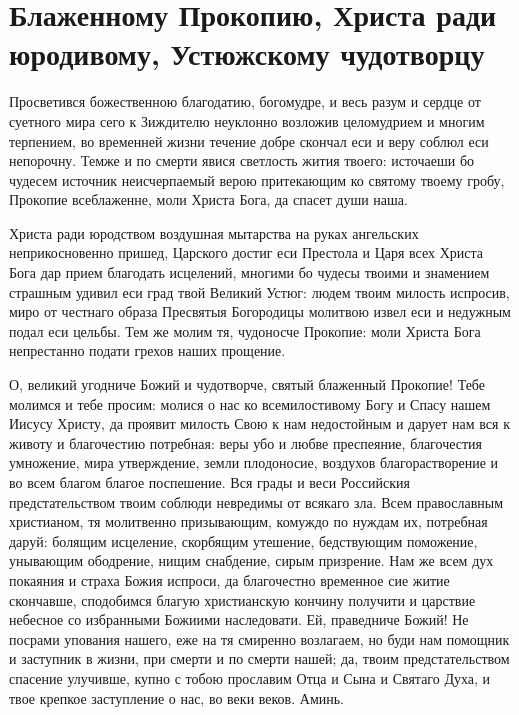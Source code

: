 \section{Блаженному Прокопию, Христа ради юродивому, Устюжскому  чудотворцу}\begin{mymulticols}
 


Просветився божественною благодатию, богомудре, и весь разум и сердце от суетного мира сего к Зиждителю неуклонно возложив целомудрием и многим терпением, во временней жизни течение добре скончал еси и веру соблюл еси непорочну. Темже и по смерти явися светлость жития твоего: источаеши бо чудесем источник неисчерпаемый верою притекающим ко святому твоему гробу, Прокопие всеблаженне, моли Христа Бога, да спасет души наша.


Христа ради юродством воздушная мытарства на руках ангельских неприкосновенно пришед, Царского достиг еси Престола и Царя всех Христа Бога дар прием благодать исцелений, многими бо чудесы твоими и знамением страшным удивил еси град твой Великий Устюг: людем твоим милость испросив, миро от честнаго образа Пресвятыя Богородицы молитвою извел еси и недужным подал еси цельбы. Тем же молим тя, чудоносче Прокопие: моли Христа Бога непрестанно подати грехов наших прощение.


О, великий угодниче Божий и чудотворче, святый блаженный Прокопие! Тебе молимся и тебе просим: молися о нас ко всемилостивому Богу и Спасу нашем Иисусу Христу, да проявит милость Свою к нам недостойным и дарует нам вся к животу и благочестию потребная: веры убо и любве преспеяние, благочестия умножение, мира утверждение, земли плодоносие, воздухов благорастворение и во всем благом благое поспешение. Вся грады и веси Российския предстательством твоим соблюди невредимы от всякаго зла. Всем православным христианом, тя молитвенно призывающим, комуждо по нуждам их, потребная даруй: болящим исцеление, скорбящим утешение, бедствующим поможение, унывающим ободрение, нищим снабдение, сирым призрение.  Нам же всем дух покаяния и страха Божия испроси, да благочестно временное сие житие скончавше, сподобимся благую христианскую кончину получити и царствие небесное со избранными Божиими наследовати. Ей, праведниче Божий! Не посрами упования нашего, еже на тя смиренно возлагаем, но буди нам помощник и заступник в жизни, при смерти и по смерти нашей; да, твоим предстательством спасение улучивше, купно с тобою прославим Отца и Сына и Святаго Духа, и твое крепкое заступление о нас, во веки веков. Аминь.

\end{mymulticols}

